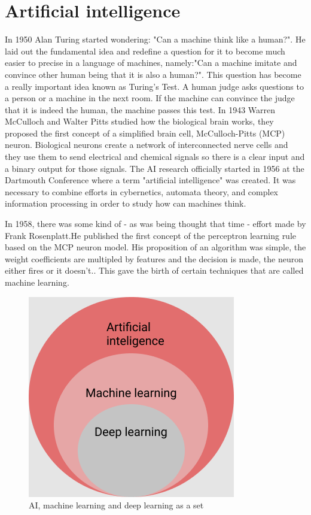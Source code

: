 \documentclass[a4paper,oneside,openright,11pt]{book}
\begin{document}
\section{Artificial intelligence}

In 1950 Alan Turing started wondering: "Can a machine think like a human?". He laid out the fundamental idea and redefine a question for it to become much easier to precise in a language of machines, namely:"Can a machine imitate and convince other human being that it is also a human?". This question has become a really important idea known as Turing's Test. A human judge asks questions to a person or a machine in the next room. If the machine can convince the judge that it is indeed the human, the machine passes this test. In 1943 Warren McCulloch and Walter Pitts studied how the biological brain works, they proposed the first concept of a simplified brain cell, McCulloch-Pitts (MCP) neuron. Biological neurons create a network of interconnected nerve cells and they use them to send electrical and chemical signals so there is a clear input and a binary output for those signals.\cite{neuron}
The AI research officially started in 1956 at the Dartmouth Conference where a term "artificial intelligence" was created. It was necessary to combine efforts in cybernetics, automata theory, and complex information processing in order to study how can machines think.\cite{histAI}

In 1958, there was some kind of - as was being thought that time -  effort made by Frank Rosenplatt.He published the first concept of the perceptron learning rule based on the MCP neuron model. His proposition of an algorithm was simple, the weight coefficients are multipled by features and the decision is made, the neuron either fires or it doesn't.\cite{raschka}. This gave the birth of certain techniques that are called machine learning.


\begin{figure}[h!]
\centering
\includegraphics[scale=0.5]{DocumentFigures/MyFigures/zbiorki.png}
\caption{AI, machine learning and deep learning as a set}
\end{figure}
\end{document}
